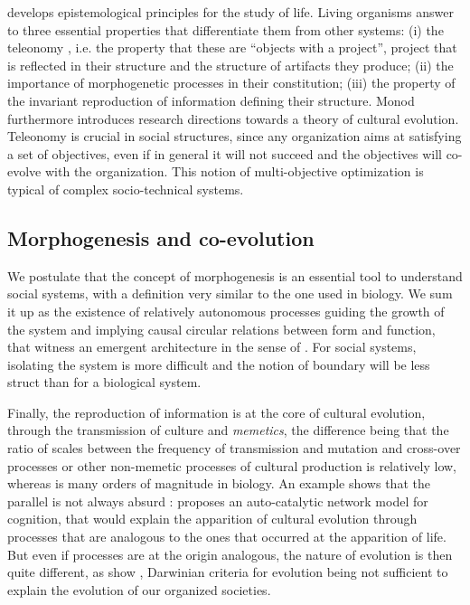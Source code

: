 \documentclass[letterpaper]{article}
\begin{document}
\cite{monod1970hasard} develops epistemological principles for the study of life. Living organisms answer to three essential properties that differentiate them from other systems: (i) the teleonomy , i.e. the property that these are ``objects with a project'', project that is reflected in their structure and the structure of artifacts they produce; (ii) the importance of morphogenetic processes in their constitution; (iii) the property of the invariant reproduction of information defining their structure. Monod furthermore introduces research directions towards a theory of cultural evolution. Teleonomy is crucial in social structures, since any organization aims at satisfying a set of objectives, even if in general it will not succeed and the objectives will co-evolve with the organization. This notion of multi-objective optimization is typical of complex socio-technical systems.



\subsection{Morphogenesis and co-evolution}

We postulate that the concept of morphogenesis is an essential tool to understand social systems, with a definition very similar to the one used in biology. We sum it up as the existence of relatively autonomous processes guiding the growth of the system and implying causal circular relations between form and function, that witness an emergent architecture in the sense of \cite{doursat2012morphogenetic}. For social systems, isolating the system is more difficult and the notion of boundary will be less struct than for a biological system. %

Finally, the reproduction of information is at the core of cultural evolution, through the transmission of culture and \emph{memetics}, the difference being that the ratio of scales between the frequency of transmission and mutation and cross-over processes or other non-memetic processes of cultural production is relatively low, whereas is many orders of magnitude in biology. An example shows that the parallel is not always absurd : \cite{2017arXiv170305917G} proposes an auto-catalytic network model for cognition, that would explain the apparition of cultural evolution through processes that are analogous to the ones that occurred at the apparition of life. %
But even if processes are at the origin analogous, the nature of evolution is then quite different, as show \cite{vanderLeeuw2009}, Darwinian criteria for evolution being not sufficient to explain the evolution of our organized societies.
\end{document}
